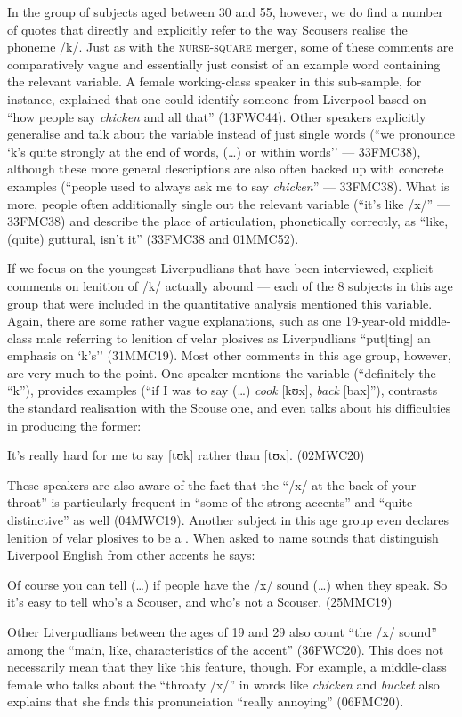 In the group of subjects aged between 30 and 55, however, we do find a number of quotes that directly and explicitly refer to the way Scousers realise the phoneme /k/.
Just as with the \textsc{nurse}-\textsc{square} merger, some of these comments are comparatively vague and essentially just consist of an example word containing the relevant variable.
A female working-class speaker in this sub-sample, for instance, explained that one could identify someone from Liverpool based on ``how people say \emph{chicken} and all that'' (13FWC44).
Other speakers explicitly generalise and talk about the variable instead of just single words (``we pronounce `k's quite strongly at the end of words, (\ldots) or within words'' --- 33FMC38), although these more general descriptions are also often backed up with concrete examples (``people used to always ask me to say \emph{chicken}'' --- 33FMC38).
What is more, people often additionally single out the relevant variable (``it's like /x/'' --- 33FMC38) and describe the place of articulation, phonetically correctly, as ``like, (quite) guttural, isn't it'' (33FMC38 and 01MMC52).

If we focus on the youngest Liverpudlians that have been interviewed, explicit comments on lenition of /k/ actually abound --- each of the 8 subjects in this age group that were included in the quantitative analysis mentioned this variable.
Again, there are some rather vague explanations, such as one 19-year-old middle-class male referring to lenition of velar plosives as Liverpudlians ``put[ting] an emphasis on `k's'' (31MMC19).
Most other comments in this age group, however, are very much to the point.
One speaker mentions the variable (``definitely the ``k''), provides examples (``if I was to say (\ldots) \emph{cook} [kʊx], \emph{back} [bax]''), contrasts the standard realisation with the Scouse one, and even talks about his difficulties in producing the former: 
\begin{example}
	It's really hard for me to say [tʊk] rather than [tʊx]. (02MWC20)
\end{example}

These speakers are also aware  of the fact that the ``/x/ at the back of your throat'' is particularly frequent in ``some of the strong accents'' and ``quite distinctive'' as well (04MWC19).
Another subject in this age group even declares lenition of velar plosives to be a .
When asked to name sounds that distinguish Liverpool English from other accents he says:
\begin{example}
	Of course you can tell (\ldots) if people have the /x/ sound (\ldots) when they speak.
	So it's easy to tell who's a Scouser, and who's not a Scouser. (25MMC19)
\end{example}
Other Liverpudlians between the ages of 19 and 29 also count ``the /x/ sound'' among the ``main, like, characteristics of the accent'' (36FWC20).
This does not necessarily mean that they like this feature, though.
For example, a middle-class female who talks about the ``throaty /x/'' in words like \emph{chicken} and \emph{bucket} also explains that she finds this pronunciation ``really annoying'' (06FMC20).


